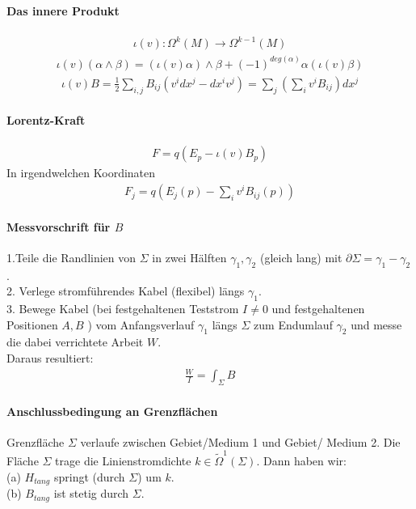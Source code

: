 \documentclass[10pt,a4paper]{article}
\begin{document}
\paragraph{Das innere Produkt} $\,$ \\
\begin{align}
\iota (v) : \Omega^k(M) \longrightarrow \Omega^{k-1} (M)
\end{align}
\begin{align}
\iota (v) ( \alpha \wedge \beta )= ( \iota (v) \alpha ) \wedge \beta + (-1)^{deg(\alpha )} \alpha ( \iota (v) \beta ) 
\end{align}
\begin{align}
\iota(v) B= \frac{1}{2} \sum_{i,j} B_{ij} (v^i dx^j - dx^i v^j)= \sum_j (\sum_i v^i B_{ij}) dx^j
\end{align}
\paragraph{Lorentz-Kraft} $\,$ \\
\begin{align}
F= q (E_p- \iota (v) B_p)
\end{align}
In irgendwelchen Koordinaten
\begin{align}
F_j=q(E_j(p)-\sum_i v^i B_{ij} (p))
\end{align}
\paragraph{Messvorschrift für $B$} $\,$ \\
1.Teile die Randlinien von $ \Sigma $ in zwei Hälften $ \gamma_1, \gamma_2 $ (gleich lang) mit $ \partial \Sigma = \gamma_1 - \gamma_2 $. \\
2. Verlege stromführendes Kabel (flexibel) längs $ \gamma_1 $. \\
3. Bewege Kabel (bei festgehaltenen Teststrom $ I \neq 0 $ und festgehaltenen Positionen $ A, B$ ) vom Anfangsverlauf $\gamma_1 $ längs $\Sigma $ zum Endumlauf $ \gamma_2 $ und messe die dabei verrichtete Arbeit $ W$.\\
Daraus resultiert:
\begin{align}
\frac{W}{I}= \int_{\Sigma} B
\end{align}
\paragraph{Anschlussbedingung an Grenzflächen} $\,$ \\
Grenzfläche $\Sigma $ verlaufe zwischen Gebiet/Medium 1 und Gebiet/ Medium 2. Die Fläche $\Sigma $ trage die Linienstromdichte $ k \in \tilde{\Omega}^1 (\Sigma) $. Dann haben wir: \\
(a) $H_{tang} $ springt (durch $\Sigma$) um $k$.  \\
(b) $B_{tang} $ ist stetig durch $\Sigma$. 
\end{document}
